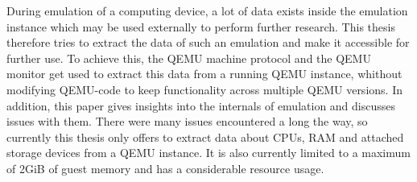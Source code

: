 
\Abstract
During emulation of a computing device,
a lot of data exists inside the emulation instance which may be used externally to perform further research.
This thesis therefore tries to extract the data of such an emulation and make it accessible for further use.
To achieve this, the QEMU machine protocol and the QEMU monitor get used to extract this data from a running QEMU instance,
whithout modifying QEMU-code to keep functionality across multiple QEMU versions.
In addition, this paper gives insights into the internals of emulation and discusses issues with them.
There were many issues encountered a long the way,
so currently this thesis only offers to extract data about CPUs, RAM and attached storage devices from a QEMU instance.
It is also currently limited to a maximum of 2GiB of guest memory and has a considerable resource usage.